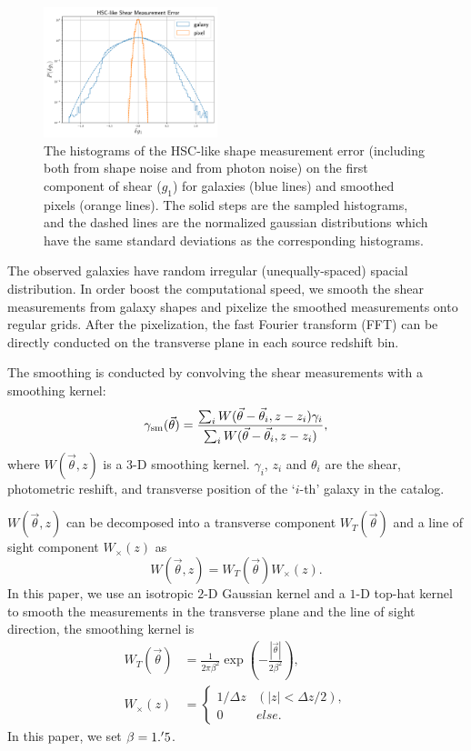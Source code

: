 \documentclass[twocolumn]{aastex62}
\begin{document}
\begin{figure}[!t]
 \centering
 \includegraphics[width=0.45\textwidth]{shapeMeasurementError-HSCY1.pdf}
 \caption{The histograms of the HSC-like shape measurement error (including both from shape noise and from photon noise) 
        on the first component of shear ($g_1$) for galaxies (blue lines) and smoothed pixels (orange lines). The solid
        steps are the sampled histograms, and the dashed lines are the normalized gaussian distributions which have the
        same standard deviations as the corresponding histograms.}
 \label{fig-noiseHistogram}
\end{figure}

The observed galaxies have random irregular (unequally-spaced) spacial distribution. In order boost the computational
speed, we smooth the shear measurements from galaxy shapes and pixelize the smoothed measurements onto regular grids.
After the pixelization, the fast Fourier transform (FFT) can be directly conducted on the transverse plane in each
source redshift bin.

The smoothing is conducted by convolving the shear measurements with a smoothing kernel:
\begin{equation}
\gamma_{\rm{sm}} (\vec{\theta})  = \frac{\sum_i  W(\vec{\theta}-\vec{{\theta}}_i,z-z_i) \gamma_i}{\sum_i W(\vec{\theta}-\vec{{\theta}}_i,z-z_i) },
\end{equation}
where $W(\vec{\theta},z)$ is a $3$-D smoothing kernel. $\gamma_i$, $z_i$ and $\theta_i$ are the shear,
photometric reshift, and transverse position of the `$i$-th' galaxy in the catalog.

$W(\vec{\theta},z)$ can be decomposed into a transverse component $W_T(\vec{\theta})$ and a line of sight component
$W_\times(z)$ as
\begin{equation}
W(\vec{\theta},z)=W_T(\vec{\theta}) W_\times (z).
\end{equation}
In this paper, we use an isotropic $2$-D Gaussian kernel and a $1$-D top-hat kernel to smooth the measurements in the
transverse plane and the line of sight direction, the smoothing kernel is
\begin{equation}
\begin{split}
W_T(\vec{\theta}) &=\frac{1}{2\pi\beta^2}\exp(-\frac{|\vec{\theta}|}{2\beta^2}),\\
W_\times (z) &=
\begin{cases}
1/\Delta z& (|z|<\Delta z/2),\\
0& else.
\end{cases}
\end{split}
\end{equation}
In this paper, we set $\beta=1.\mbox{$^\prime$}5$.
\end{document}
